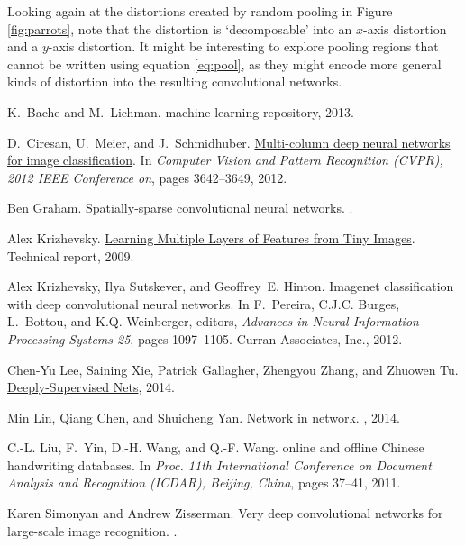 \documentclass[english]{article}
\begin{document}
Looking again at the distortions created by random pooling in Figure
\ref{fig:parrots}, note that the distortion is `decomposable' into
an $x$-axis distortion and a $y$-axis distortion. It might be interesting
to explore pooling regions that cannot be written using equation \ref{eq:pool},
as they might encode more general kinds of distortion into the resulting
convolutional networks.
\begin{thebibliography}{10}

K.~Bache and M.~Lichman.
 machine learning repository, 2013.

D.~Ciresan, U.~Meier, and J.~Schmidhuber.
\newblock \href{www.idsia.ch/~juergen/cvpr2012.pd}{Multi-column deep neural
  networks for image classification}.
\newblock In {\em Computer Vision and Pattern Recognition (CVPR), 2012 IEEE
  Conference on}, pages 3642--3649, 2012.

Ben Graham.
\newblock Spatially-sparse convolutional neural networks.
.

Alex Krizhevsky.
\newblock \href{http://www.cs.toronto.edu/~kriz/cifar.html}{Learning Multiple
  Layers of Features from Tiny Images}.
\newblock Technical report, 2009.

Alex Krizhevsky, Ilya Sutskever, and Geoffrey~E. Hinton.
\newblock Imagenet classification with deep convolutional neural networks.
\newblock In F.~Pereira, C.J.C. Burges, L.~Bottou, and K.Q. Weinberger,
  editors, {\em Advances in Neural Information Processing Systems 25}, pages
  1097--1105. Curran Associates, Inc., 2012.

Chen-Yu Lee, Saining Xie, Patrick Gallagher, Zhengyou Zhang, and Zhuowen Tu.
\newblock \href{http://arxiv.org/abs/1409.5185}{Deeply-Supervised Nets}, 2014.

Min Lin, Qiang Chen, and Shuicheng Yan.
\newblock Network in network.
, 2014.

C.-L. Liu, F.~Yin, D.-H. Wang, and Q.-F. Wang.
 online and offline {C}hinese handwriting databases.
\newblock In {\em Proc. 11th International Conference on Document Analysis and
  Recognition (ICDAR), Beijing, China}, pages 37--41, 2011.

Karen Simonyan and Andrew Zisserman.
\newblock Very deep convolutional networks for large-scale image recognition.
.


\end{thebibliography}
\end{document}
